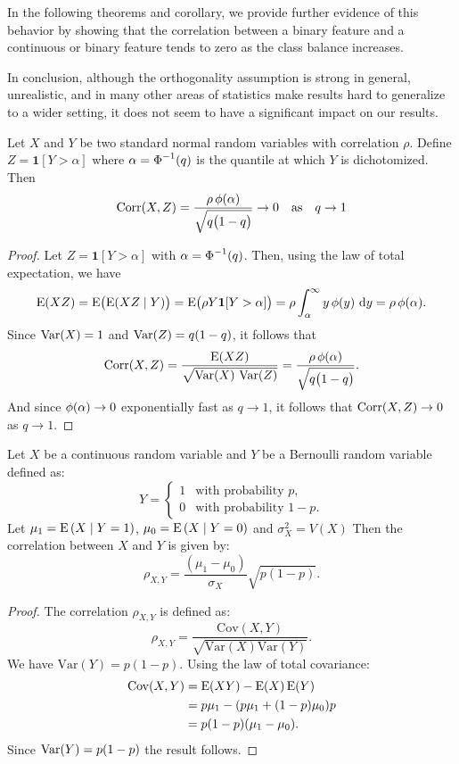 In the following theorems and corollary, we provide further evidence of this behavior by
showing that the correlation between a binary feature and a continuous or binary feature
tends to zero as the class balance increases.

In conclusion, although the orthogonality assumption is strong in general, unrealistic, and
in many other areas of statistics make results hard to generalize to a wider setting, it
does not seem to have a significant impact on our results.

\begin{theorem}
  Let \(X\) and \(Y\) be two standard normal random variables with correlation \(\rho\).
  Define \(Z = \bm{1}[Y > \alpha]\) where \(\alpha = \operatorname{\Phi}^{-1}(q)\) is the
  quantile at which \(Y\) is dichotomized.
  Then
  \[
    \operatorname{Corr}(X,Z)
    = \frac{\rho\operatorname{\phi}(\alpha)}{\sqrt{q \bigl(1 - q\bigr)}} \rightarrow 0 \quad\text{as}\quad q \rightarrow 1
  \]
\end{theorem}
\begin{proof}
  Let \(Z = \mathbf{1}[Y > \alpha]\) with \(\alpha = \operatorname{\Phi}^{-1}(q)\). Then,
  using the law of total expectation, we have
  \[
    \operatorname{E}(XZ) = \operatorname{E}\bigl(\operatorname{E}(XZ \mid Y)\bigr) = \operatorname{E}\bigl(\rho Y \bm{1}[Y > \alpha]\bigr)
    = \rho \int_{\alpha}^{\infty} y \operatorname{\phi}(y)\,\mathop{}\!\mathrm{d} y = \rho \operatorname{\phi}(\alpha).
  \]
  Since \(\operatorname{Var}(X) = 1\) and \(\operatorname{Var}(Z) = q (1 - q)\), it follows that
  \[
    \operatorname{Corr}(X,Z) = \frac{\operatorname{E}(XZ)}{\sqrt{\operatorname{Var}(X)\,\operatorname{Var}(Z)}} = \frac{\rho \operatorname{\phi}(\alpha)}{\sqrt{q \bigl(1 - q\bigr)}}.
  \]
  And since \(\operatorname{\phi}(\alpha) \to 0\) exponentially fast as \(q \to 1\), it follows that
  \(\operatorname{Corr}(X,Z) \to 0\) as \(q \to 1\).
\end{proof}

\begin{theorem}
  Let \(X\) be a continuous random variable and \(Y\) be a Bernoulli random variable defined as:
  \[
    Y = \begin{cases}
      1 & \text{with probability } p,   \\
      0 & \text{with probability } 1-p.
    \end{cases}
  \]
  Let \(\mu_1 = \operatorname{E} \left( X \mid Y=1 \right)\), \(\mu_0 = \operatorname{E} \left( X \mid Y=0 \right)\) and
  $\sigma_X^2 = V \left(X \right)$ Then the correlation between \(X\) and \(Y\) is given by:
  \[
    \rho_{X,Y} = \frac{(\mu_1 - \mu_0)}{\sigma_X}\sqrt{p(1-p)}.
  \]
\end{theorem}

\begin{proof}
  The correlation \(\rho_{X,Y}\) is defined as:
  \[
    \rho_{X,Y} = \frac{\mathrm{Cov}(X,Y)}{\sqrt{\mathrm{Var}(X)\mathrm{Var}(Y)}}.
  \]
  We have \(\mathrm{Var}(Y)=p(1-p)\). Using the law of total covariance:
  \begin{align*}
    \mathrm{Cov}(X,Y) & = \operatorname{E} (XY) - \operatorname{E}(X) \operatorname{E}(Y)           \\
                      & = p\mu_1 - (p\mu_1 + (1-p)\mu_0)p \\
                      & = p(1-p)(\mu_1 - \mu_0).
  \end{align*}
  Since $\operatorname{Var} (Y)=p(1-p)$ the result follows.
\end{proof}

